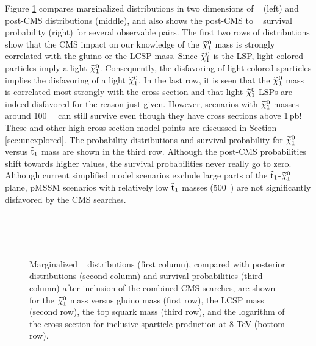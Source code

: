 Figure \ref{fig:twoD} compares marginalized distributions in two dimensions of \preCMS~ (left) and post-CMS distributions (middle), and also shows the post-CMS to \preCMS~ survival probability (right) for several observable pairs.  The first two rows of distributions show that the CMS impact on our knowledge of 
the $\widetilde{\chi}^0_1$ mass is strongly correlated with the gluino or the LCSP mass.  Since $\widetilde{\chi}^0_1$ is the LSP,  light colored particles imply a light $\widetilde{\chi}^0_1$.
Consequently, the disfavoring of light colored sparticles implies the disfavoring of a light $\widetilde{\chi}^0_1$.  In the last row, it is seen that the $\widetilde{\chi}^0_1$ mass is correlated most strongly with the cross section and that light $\widetilde{\chi}^0_1$ LSPs are indeed disfavored for the reason just given.  
However, scenarios with $\widetilde{\chi}^0_1$ masses around 100~\GeV~
can still survive even though they have cross sections above 1\,pb! These and other high cross section model points are discussed in Section \ref{sec:unexplored}.
The probability distributions and survival
probability for $\widetilde{\chi}^0_1$ versus $\tilde{\text{t}}_1$ mass are shown in the third row.  Although the
post-CMS probabilities shift towards higher values, the survival
probabilities never really go to zero.  Although current simplified model
scenarios exclude large parts of the $\tilde{\text{t}}_1$-$\widetilde{\chi}^0_1$ plane, 
pMSSM scenarios with relatively low $\tilde{\text{t}}_1$ masses (500~\GeV) are
not significantly disfavored by the CMS searches. 

\begin{figure}[p]
  \centering
  \\
  \\
    \\
\vspace{1mm}
  \caption{Marginalized \preCMS~ distributions (first column),
    compared with posterior distributions (second column)
    and survival probabilities (third column) after inclusion of the combined CMS searches,
    are shown for the
    $\widetilde{\chi}^0_1$ mass versus gluino mass (first row), the LCSP mass
    (second row), the top squark mass (third row),  and the
    logarithm of the cross section for inclusive sparticle production at 8 TeV (bottom row).
  }
  \label{fig:twoD}
\end{figure}

